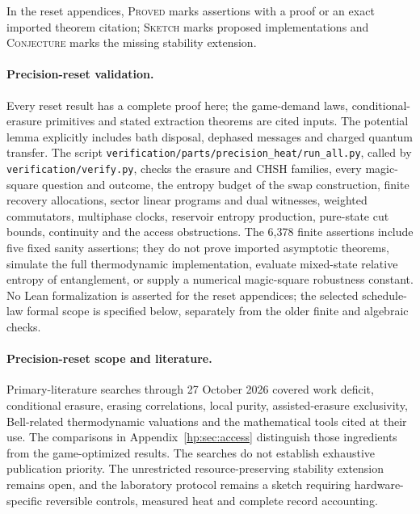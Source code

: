 In the reset appendices, \textsc{Proved} marks assertions with a proof or an exact imported theorem citation; \textsc{Sketch} marks proposed implementations and \textsc{Conjecture} marks the missing stability extension.

\paragraph{Precision-reset validation.} Every reset result has a complete proof here; the game-demand laws, conditional-erasure primitives and stated extraction theorems are cited inputs. The potential lemma explicitly includes bath disposal, dephased messages and charged quantum transfer. The script \texttt{verification/parts/precision\_heat/run\_all.py}, called by \texttt{verification/verify.py}, checks the erasure and CHSH families, every magic-square question and outcome, the entropy budget of the swap construction, finite recovery allocations, sector linear programs and dual witnesses, weighted commutators, multiphase clocks, reservoir entropy production, pure-state cut bounds, continuity and the access obstructions. The 6,378 finite assertions include five fixed sanity assertions; they do not prove imported asymptotic theorems, simulate the full thermodynamic implementation, evaluate mixed-state relative entropy of entanglement, or supply a numerical magic-square robustness constant. No Lean formalization is asserted for the reset appendices; the selected schedule-law formal scope is specified below, separately from the older finite and algebraic checks.

\paragraph{Precision-reset scope and literature.} Primary-literature searches through 27 October 2026 covered work deficit, conditional erasure, erasing correlations, local purity, assisted-erasure exclusivity, Bell-related thermodynamic valuations and the mathematical tools cited at their use. The comparisons in Appendix~\ref{hp:sec:access} distinguish those ingredients from the game-optimized results. The searches do not establish exhaustive publication priority. The unrestricted resource-preserving stability extension remains open, and the laboratory protocol remains a sketch requiring hardware-specific reversible controls, measured heat and complete record accounting.


